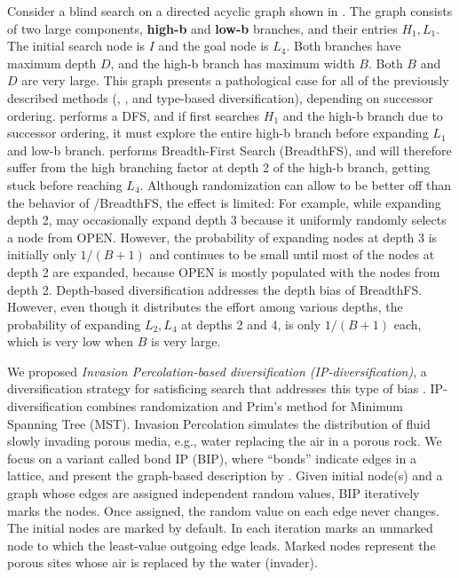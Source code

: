 Consider a blind search on a directed acyclic graph
shown in .
The graph consists of two large components, \textbf{high-b} and \textbf{low-b} branches, and their entries $H_1,L_1$. The initial search node is $I$ and the goal node is $L_4$.
Both branches have maximum depth $D$, and the high-b branch has maximum width $B$.
Both $B$ and $D$ are very large.
This graph presents a pathological case for all of the previously described methods (\lifo, \fifo, \ro and type-based diversification), depending on successor ordering.
\lifo performs a DFS, and if \lifo first searches $H_1$ and the high-b branch due to successor ordering, it must explore the entire high-b branch before expanding $L_1$ and low-b branch.
\fifo performs Breadth-First Search (BreadthFS), and  will therefore suffer from the  high branching factor at depth 2 of the high-b branch, getting stuck before reaching $L_4$.
Although randomization can allow \ro to be better off than the behavior of \fifo/BreadthFS, the effect is limited:
For example, while expanding depth 2, \ro may occasionally expand depth 3 because it uniformly randomly selects a node from OPEN.
However, the probability of expanding nodes at depth 3 is initially only $1/(B+1)$ and continues to be small until  most of the nodes at depth 2 are expanded, 
because OPEN is mostly populated with the nodes from depth 2.
Depth-based diversification addresses the depth bias of BreadthFS.
However, even though it distributes the effort among various depths,
the probability of expanding $L_2,L_4$ at depths 2 and 4, is only $1/(B+1)$ each, which is very low when $B$ is very large.


We proposed \emph{Invasion Percolation-based diversification (IP-diversification)}, a
diversification strategy for satisficing search that addresses this type of bias \cite{Asai2017b}.
IP-diversification combines randomization and Prim's method \cite{prim1957shortest} for Minimum
Spanning Tree (MST).
% 
Invasion Percolation \cite{wilkinson1983invasion} simulates the distribution of fluid slowly
invading porous media, e.g., water replacing the air in a porous rock.  We focus on a variant called
bond IP (BIP), where ``bonds'' indicate edges in a lattice, and present the graph-based description
by \cite{barabasi1996invasion}.
% 
Given initial node(s) and a graph whose edges are assigned independent random values, BIP
iteratively marks the nodes.  Once assigned, the random value on each edge never changes.
The initial nodes are marked by default.  In each iteration marks an unmarked node to which the
least-value outgoing edge leads.  Marked nodes represent the porous sites whose air is replaced by
the water (invader).


